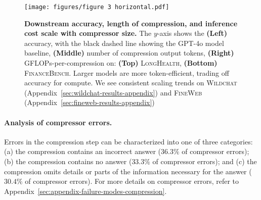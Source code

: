 \documentclass{article} %
\begin{document}
\begin{figure}[ht]
    \centering
    \texttt{[image: figures/figure 3 horizontal.pdf]}
    \caption{\textbf{Downstream accuracy, length of compression, and inference cost scale with compressor size.} The $y$-axis shows the \textbf{(Left)} accuracy, with the black dashed line showing the GPT-4o model baseline, \textbf{(Middle)} number of compression output tokens, \textbf{(Right)} GFLOPs-per-compression on: \textbf{(Top)} \textsc{LongHealth}, \textbf{(Bottom)} \textsc{FinanceBench}. Larger models are more token-efficient, trading off accuracy for compute. We see consistent scaling trends on \textsc{Wildchat} (Appendix~\ref{sec:wildchat-results-appendix}) and \textsc{FineWeb} (Appendix~\ref{sec:fineweb-results-appendix})}
    \label{fig:figure-3-properties}
\end{figure}

\paragraph*{Analysis of compressor errors.} 
Errors in the compression step can be characterized into one of three categories: (a) the compression contains an incorrect answer ($36.3\%$ of compressor errors); (b) the compression contains no answer ($33.3\%$ of compressor errors); and (c) the compression omits details or parts of the information necessary for the answer ($30.4\%$ of compressor errors).
For more details on compressor errors, refer to Appendix~\ref{sec:appendix-failure-modes-compression}.
\end{document}
